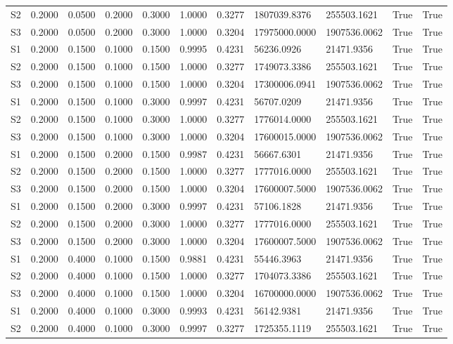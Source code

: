 \documentclass[11pt,a4paper]{article}
\begin{document}
\begin{landscape}
{\begin{longtable}{lllllllllll}
S2 & 0.2000 & 0.0500 & 0.2000 & 0.3000 & 1.0000 & 0.3277 & 1807039.8376 & 255503.1621 & True & True \\
S3 & 0.2000 & 0.0500 & 0.2000 & 0.3000 & 1.0000 & 0.3204 & 17975000.0000 & 1907536.0062 & True & True \\
S1 & 0.2000 & 0.1500 & 0.1000 & 0.1500 & 0.9995 & 0.4231 & 56236.0926 & 21471.9356 & True & True \\
S2 & 0.2000 & 0.1500 & 0.1000 & 0.1500 & 1.0000 & 0.3277 & 1749073.3386 & 255503.1621 & True & True \\
S3 & 0.2000 & 0.1500 & 0.1000 & 0.1500 & 1.0000 & 0.3204 & 17300006.0941 & 1907536.0062 & True & True \\
S1 & 0.2000 & 0.1500 & 0.1000 & 0.3000 & 0.9997 & 0.4231 & 56707.0209 & 21471.9356 & True & True \\
S2 & 0.2000 & 0.1500 & 0.1000 & 0.3000 & 1.0000 & 0.3277 & 1776014.0000 & 255503.1621 & True & True \\
S3 & 0.2000 & 0.1500 & 0.1000 & 0.3000 & 1.0000 & 0.3204 & 17600015.0000 & 1907536.0062 & True & True \\
S1 & 0.2000 & 0.1500 & 0.2000 & 0.1500 & 0.9987 & 0.4231 & 56667.6301 & 21471.9356 & True & True \\
S2 & 0.2000 & 0.1500 & 0.2000 & 0.1500 & 1.0000 & 0.3277 & 1777016.0000 & 255503.1621 & True & True \\
S3 & 0.2000 & 0.1500 & 0.2000 & 0.1500 & 1.0000 & 0.3204 & 17600007.5000 & 1907536.0062 & True & True \\
S1 & 0.2000 & 0.1500 & 0.2000 & 0.3000 & 0.9997 & 0.4231 & 57106.1828 & 21471.9356 & True & True \\
S2 & 0.2000 & 0.1500 & 0.2000 & 0.3000 & 1.0000 & 0.3277 & 1777016.0000 & 255503.1621 & True & True \\
S3 & 0.2000 & 0.1500 & 0.2000 & 0.3000 & 1.0000 & 0.3204 & 17600007.5000 & 1907536.0062 & True & True \\
S1 & 0.2000 & 0.4000 & 0.1000 & 0.1500 & 0.9881 & 0.4231 & 55446.3963 & 21471.9356 & True & True \\
S2 & 0.2000 & 0.4000 & 0.1000 & 0.1500 & 1.0000 & 0.3277 & 1704073.3386 & 255503.1621 & True & True \\
S3 & 0.2000 & 0.4000 & 0.1000 & 0.1500 & 1.0000 & 0.3204 & 16700000.0000 & 1907536.0062 & True & True \\
S1 & 0.2000 & 0.4000 & 0.1000 & 0.3000 & 0.9993 & 0.4231 & 56142.9381 & 21471.9356 & True & True \\
S2 & 0.2000 & 0.4000 & 0.1000 & 0.3000 & 0.9997 & 0.3277 & 1725355.1119 & 255503.1621 & True & True \\

\end{longtable}}
\end{landscape}
\end{document}
